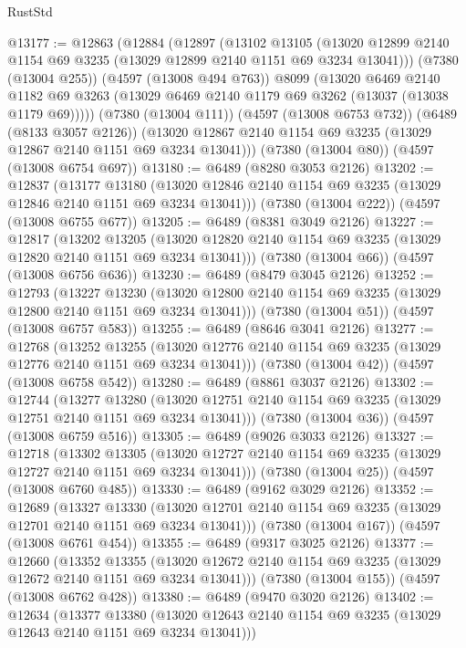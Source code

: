 \begin{lexlean}{RustStd}
\begin{coremodule}
@13177 := @12863
    (@12884
      (@12897
        (@13102
          @13105
          (@13020 @12899 @2140 @1154 @69 @3235 (@13029 @12899 @2140 @1151 @69 @3234 @13041)))
        (@7380 (@13004 @255))
        (@4597 (@13008 @494 @763))
        @8099
        (@13020
          @6469
          @2140
          @1182
          @69
          @3263
          (@13029 @6469 @2140 @1179 @69 @3262 (@13037 (@13038 @1179 @69)))))
      (@7380 (@13004 @111))
      (@4597 (@13008 @6753 @732))
      (@6489 (@8133 @3057 @2126))
      (@13020 @12867 @2140 @1154 @69 @3235 (@13029 @12867 @2140 @1151 @69 @3234 @13041)))
    (@7380 (@13004 @80))
    (@4597 (@13008 @6754 @697))
@13180 := @6489 (@8280 @3053 @2126)
@13202 := @12837
    (@13177
      @13180
      (@13020 @12846 @2140 @1154 @69 @3235 (@13029 @12846 @2140 @1151 @69 @3234 @13041)))
    (@7380 (@13004 @222))
    (@4597 (@13008 @6755 @677))
@13205 := @6489 (@8381 @3049 @2126)
@13227 := @12817
    (@13202
      @13205
      (@13020 @12820 @2140 @1154 @69 @3235 (@13029 @12820 @2140 @1151 @69 @3234 @13041)))
    (@7380 (@13004 @66))
    (@4597 (@13008 @6756 @636))
@13230 := @6489 (@8479 @3045 @2126)
@13252 := @12793
    (@13227
      @13230
      (@13020 @12800 @2140 @1154 @69 @3235 (@13029 @12800 @2140 @1151 @69 @3234 @13041)))
    (@7380 (@13004 @51))
    (@4597 (@13008 @6757 @583))
@13255 := @6489 (@8646 @3041 @2126)
@13277 := @12768
    (@13252
      @13255
      (@13020 @12776 @2140 @1154 @69 @3235 (@13029 @12776 @2140 @1151 @69 @3234 @13041)))
    (@7380 (@13004 @42))
    (@4597 (@13008 @6758 @542))
@13280 := @6489 (@8861 @3037 @2126)
@13302 := @12744
    (@13277
      @13280
      (@13020 @12751 @2140 @1154 @69 @3235 (@13029 @12751 @2140 @1151 @69 @3234 @13041)))
    (@7380 (@13004 @36))
    (@4597 (@13008 @6759 @516))
@13305 := @6489 (@9026 @3033 @2126)
@13327 := @12718
    (@13302
      @13305
      (@13020 @12727 @2140 @1154 @69 @3235 (@13029 @12727 @2140 @1151 @69 @3234 @13041)))
    (@7380 (@13004 @25))
    (@4597 (@13008 @6760 @485))
@13330 := @6489 (@9162 @3029 @2126)
@13352 := @12689
    (@13327
      @13330
      (@13020 @12701 @2140 @1154 @69 @3235 (@13029 @12701 @2140 @1151 @69 @3234 @13041)))
    (@7380 (@13004 @167))
    (@4597 (@13008 @6761 @454))
@13355 := @6489 (@9317 @3025 @2126)
@13377 := @12660
    (@13352
      @13355
      (@13020 @12672 @2140 @1154 @69 @3235 (@13029 @12672 @2140 @1151 @69 @3234 @13041)))
    (@7380 (@13004 @155))
    (@4597 (@13008 @6762 @428))
@13380 := @6489 (@9470 @3020 @2126)
@13402 := @12634
    (@13377
      @13380
      (@13020 @12643 @2140 @1154 @69 @3235 (@13029 @12643 @2140 @1151 @69 @3234 @13041)))

\end{coremodule}
\end{lexlean}
